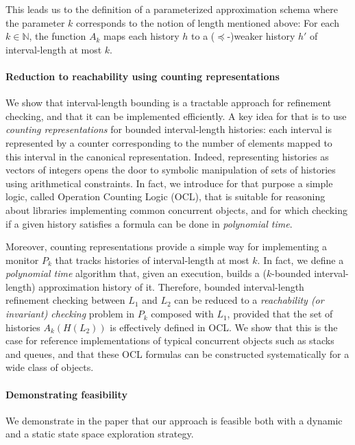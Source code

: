 This leads us to the definition of a parameterized approximation schema where
the parameter $k$ corresponds to the notion of length mentioned above: For each
$k \in \mathbb{N}$, the function $A_k$ maps each history $h$ to a
($\preceq$-)weaker history $h'$ of interval-length at most $k$.

\paragraph{Reduction to reachability using counting representations}

We show that interval-length bounding is a tractable approach for refinement
checking, and that it can be implemented efficiently. A key idea for that is to
use \emph{counting representations} for bounded interval-length histories: each
interval is represented by a counter corresponding to the number of elements
mapped to this interval in the canonical representation. Indeed, representing
histories as vectors of integers opens the door to symbolic manipulation of
sets of histories using arithmetical constraints. In fact, we introduce for
that purpose a simple logic, called Operation Counting Logic (OCL), that is
suitable for reasoning about libraries implementing common concurrent objects,
and for which checking if a given history satisfies a formula can be done in
\emph{polynomial time}.

Moreover, counting representations provide a simple way for implementing a
monitor $P_k$ that tracks histories of interval-length at most $k$. In fact, we
define a \emph{polynomial time} algorithm that, given an execution, builds a
($k$-bounded interval-length) approximation history of it. Therefore, bounded
interval-length refinement checking between $L_1$ and $L_2$ can be reduced to a
\emph{reachability (or invariant) checking} problem in $P_k$ composed with
$L_1$, provided that the set of histories $A_k(H(L_2))$ is effectively defined
in OCL. We show that this is the case for reference implementations of typical
concurrent objects such as stacks and queues, and that these OCL formulas can
be constructed systematically for a wide class of objects.

\paragraph{Demonstrating feasibility}

We demonstrate in the paper that our approach is feasible both with a dynamic
and a static state space exploration strategy.


